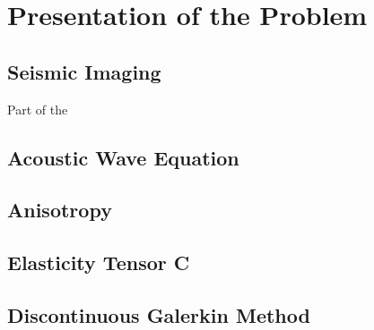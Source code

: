 \newpage
\section{Presentation of the Problem}

\subsection{Seismic Imaging}

Part of the 

\subsection{Acoustic Wave Equation}

\subsection{Anisotropy}

\subsection{Elasticity Tensor C}

\subsection{Discontinuous Galerkin Method}
